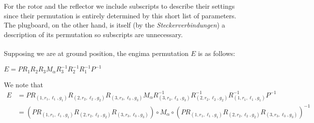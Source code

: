 For the rotor and the reflector we include subscripts to describe their settings since their permutation is entirely determined by this short list of parameters.
The plugboard, on the other hand, is itself (by the \emph{Steckerverbindungen}) a description of its permutation so subscripts are unnecessary.
\\\\Supposing we are at ground position, the engima permutation $E$ is as follows:
\begin{center}
    $E = PR_1R_2R_3M_\alpha R_3^{-1} R_2^{-1} R_1^{-1} P^{-1}$
\end{center}
\noindent We note that
\begin{align*}
    E &= PR_{(1,r_1, \ell_1, g_1)}R_{(2, r_2, \ell_2, g_2)}R_{(3, r_3, \ell_3, g_3)}M_\alpha R_{(3, r_3, \ell_3, g_3)}^{-1} R_{(2, r_2, \ell_2, g_2)}^{-1} R_{(1,r_1, \ell_1, g_1)}^{-1} P^{-1}
    \\&=(PR_{(1,r_1, \ell_1, g_1)}R_{(2, r_2, \ell_2, g_2)}R_{(3, r_3, \ell_3, g_3)})\circ M_\alpha \circ(PR_{(1,r_1, \ell_1, g_1)}R_{(2, r_2, \ell_2, g_2)}R_{(3, r_3, \ell_3, g_3)})^{-1}
\end{align*}